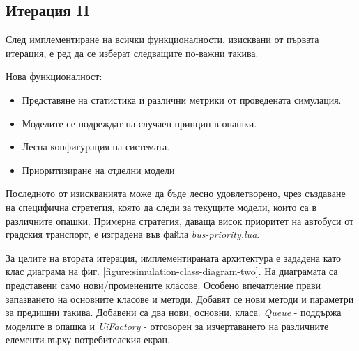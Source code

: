 	\subsection{Итерация II}
		
		След имплементиране на всички функционалности, изисквани от първата итерация, е ред да се изберат
		следващите по-важни такива.
		
		Нова функционалност:
		\begin{itemize}
			\item Представяне на статистика и различни метрики от проведената симулация.
			\item Моделите се подреждат на случаен принцип в опашки.
			\item Лесна конфигурация на системата.
			\item Приоритизиране на отделни модели
		\end{itemize}
		
		Последното от изискванията може да бъде лесно удовлетворено, чрез създаване на специфична стратегия,
		която да следи за текущите модели, които са в различните опашки. Примерна стратегия, даваща висок
		приоритет на автобуси от градския транспорт, е изградена във файла \emph{bus-priority.lua}.
		
		За целите на втората итерация, имплементираната архитектура е зададена като клас диаграма на фиг. \ref{figure:simulation-class-diagram-two}.
		На диаграмата са представени само нови/променените класове. Особено впечатление прави запазването на основните класове и методи. 
		Добавят се нови методи и параметри за предишни такива.	Добавени са два нови, основни, класа. \emph{Queue} - поддържа моделите
		в опашка и \emph{UiFactory} - отговорен за изчертаването на различните елементи върху потребителския екран.		
		
